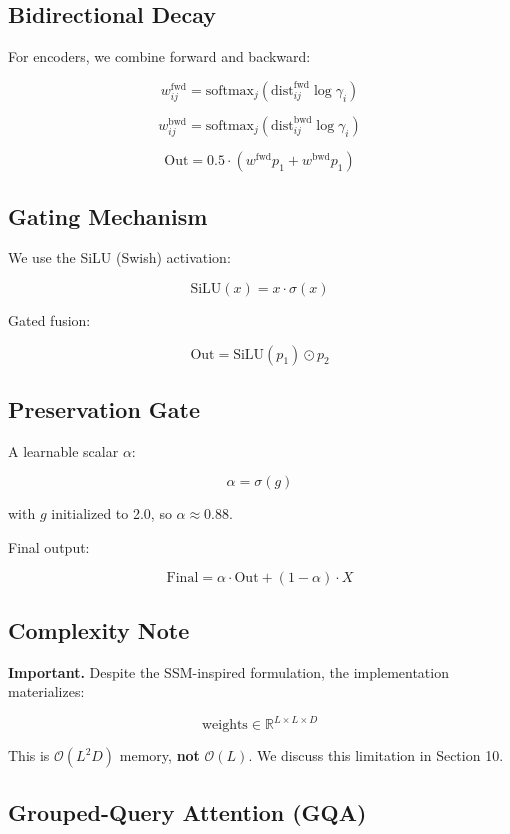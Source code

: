 \subsection{Bidirectional Decay}

For encoders, we combine forward and backward:

\[
w_{ij}^\text{fwd} = \text{softmax}_j(\text{dist}_{ij}^\text{fwd} \log \gamma_i)
\tag{3.10}
\]

\[
w_{ij}^\text{bwd} = \text{softmax}_j(\text{dist}_{ij}^\text{bwd} \log \gamma_i)
\tag{3.11}
\]

\[
\text{Out} = 0.5 \cdot (w^\text{fwd} p_1 + w^\text{bwd} p_1)
\tag{3.12}
\]

\subsection{Gating Mechanism}

We use the SiLU (Swish) activation:

\[
\text{SiLU}(x) = x \cdot \sigma(x)
\tag{3.13}
\]

Gated fusion:

\[
\text{Out} = \text{SiLU}(p_1) \odot p_2
\tag{3.14}
\]

\subsection{Preservation Gate}

A learnable scalar $\alpha$:

\[
\alpha = \sigma(g)
\tag{3.15}
\]

with $g$ initialized to 2.0, so $\alpha \approx 0.88$.

Final output:

\[
\text{Final} = \alpha \cdot \text{Out} + (1 - \alpha) \cdot X
\tag{3.16}
\]

\subsection{Complexity Note}

\textbf{Important.} Despite the SSM-inspired formulation, the implementation 
materializes:

\[
\text{weights} \in \mathbb{R}^{L \times L \times D}
\tag{3.17}
\]

This is $\mathcal{O}(L^2 D)$ memory, \textbf{not} $\mathcal{O}(L)$. We discuss 
this limitation in Section 10.

\subsection{Grouped-Query Attention (GQA)}

